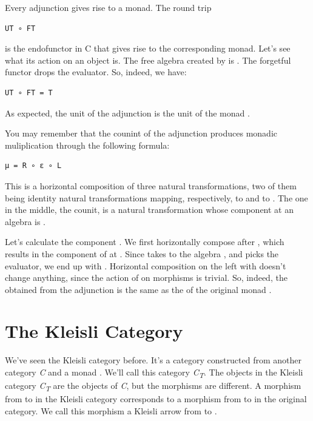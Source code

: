 Every adjunction gives rise to a monad. The round trip

\begin{verbatim}
UT ∘ FT
\end{verbatim}

is the endofunctor in C that gives rise to the corresponding monad.
Let's see what its action on an object  is. The free algebra
created by  is . The forgetful functor
 drops the evaluator. So, indeed, we have:

\begin{verbatim}
UT ∘ FT = T
\end{verbatim}

As expected, the unit of the adjunction is the unit of the monad
.

You may remember that the counint of the adjunction produces monadic
muliplication through the following formula:

\begin{verbatim}
μ = R ∘ ε ∘ L
\end{verbatim}

This is a horizontal composition of three natural transformations, two
of them being identity natural transformations mapping, respectively,
 to  and  to . The one in the
middle, the counit, is a natural transformation whose component at an
algebra  is .

Let's calculate the component . We first horizontally compose
 after , which results in the component of
 at . Since  takes  to the
algebra , and  picks the evaluator, we end
up with . Horizontal composition on the left with 
doesn't change anything, since the action of  on morphisms is
trivial. So, indeed, the  obtained from the adjunction is the
same as the  of the original monad .

\section{The Kleisli Category}\label{the-kleisli-category}

We've seen the Kleisli category before. It's a category constructed from
another category \emph{C} and a monad . We'll call this
category \emph{C\textsubscript{T}}. The objects in the Kleisli category
\emph{C\textsubscript{T}} are the objects of \emph{C}, but the morphisms
are different. A morphism  from  to  in
the Kleisli category corresponds to a morphism  from
 to  in the original category. We call this
morphism a Kleisli arrow from  to .

